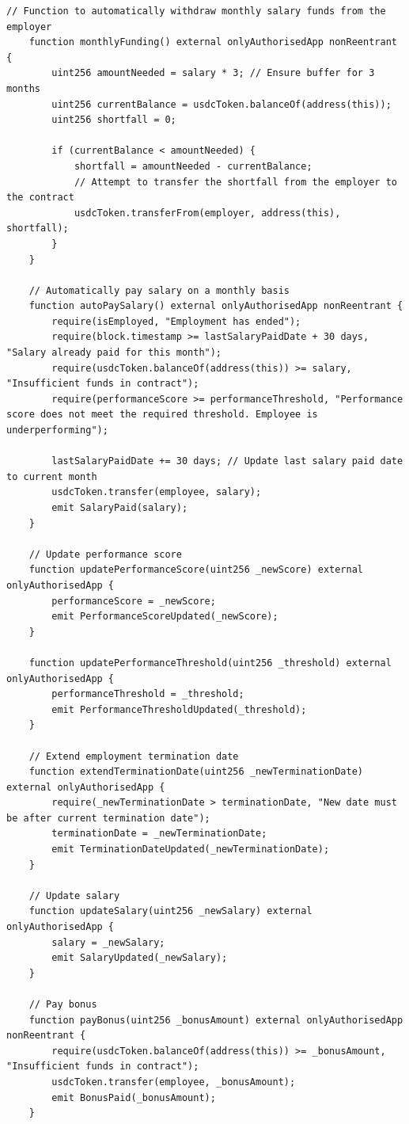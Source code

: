 \begin{lstlisting}[caption=General Purpose Smart Contract]
    // Function to automatically withdraw monthly salary funds from the employer
    function monthlyFunding() external onlyAuthorisedApp nonReentrant {
        uint256 amountNeeded = salary * 3; // Ensure buffer for 3 months
        uint256 currentBalance = usdcToken.balanceOf(address(this));
        uint256 shortfall = 0;

        if (currentBalance < amountNeeded) {
            shortfall = amountNeeded - currentBalance;
            // Attempt to transfer the shortfall from the employer to the contract
            usdcToken.transferFrom(employer, address(this), shortfall);
        }
    }

    // Automatically pay salary on a monthly basis
    function autoPaySalary() external onlyAuthorisedApp nonReentrant {
        require(isEmployed, "Employment has ended");
        require(block.timestamp >= lastSalaryPaidDate + 30 days, "Salary already paid for this month");
        require(usdcToken.balanceOf(address(this)) >= salary, "Insufficient funds in contract");
        require(performanceScore >= performanceThreshold, "Performance score does not meet the required threshold. Employee is underperforming");

        lastSalaryPaidDate += 30 days; // Update last salary paid date to current month
        usdcToken.transfer(employee, salary);
        emit SalaryPaid(salary);
    }

    // Update performance score
    function updatePerformanceScore(uint256 _newScore) external onlyAuthorisedApp {
        performanceScore = _newScore;
        emit PerformanceScoreUpdated(_newScore);
    }

    function updatePerformanceThreshold(uint256 _threshold) external onlyAuthorisedApp {
        performanceThreshold = _threshold;
        emit PerformanceThresholdUpdated(_threshold);
    }

    // Extend employment termination date
    function extendTerminationDate(uint256 _newTerminationDate) external onlyAuthorisedApp {
        require(_newTerminationDate > terminationDate, "New date must be after current termination date");
        terminationDate = _newTerminationDate;
        emit TerminationDateUpdated(_newTerminationDate);
    }

    // Update salary
    function updateSalary(uint256 _newSalary) external onlyAuthorisedApp {
        salary = _newSalary;
        emit SalaryUpdated(_newSalary);
    }

    // Pay bonus
    function payBonus(uint256 _bonusAmount) external onlyAuthorisedApp nonReentrant {
        require(usdcToken.balanceOf(address(this)) >= _bonusAmount, "Insufficient funds in contract");
        usdcToken.transfer(employee, _bonusAmount);
        emit BonusPaid(_bonusAmount);
    }


\end{lstlisting}
